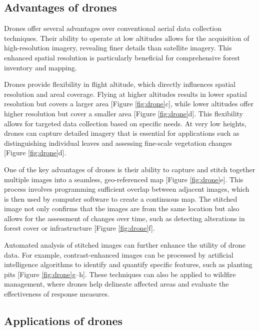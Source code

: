 \documentclass[
  12 pt,
]{Nemilov}
\begin{document}
\subsection{Advantages of drones}\label{advantages-of-drones}

Drones offer several advantages over conventional aerial data collection techniques. Their ability to operate at low altitudes allows for the acquisition of high-resolution imagery, revealing finer details than satellite imagery. This enhanced spatial resolution is particularly beneficial for comprehensive forest inventory and mapping.

Drones provide flexibility in flight altitude, which directly influences spatial resolution and areal coverage. Flying at higher altitudes results in lower spatial resolution but covers a larger area {[}Figure \ref{fig:drone}c{]}, while lower altitudes offer higher resolution but cover a smaller area {[}Figure \ref{fig:drone}d{]}. This flexibility allows for targeted data collection based on specific needs. At very low heights, drones can capture detailed imagery that is essential for applications such as distinguishing individual leaves and assessing fine-scale vegetation changes {[}Figure \ref{fig:drone}d{]}.

One of the key advantages of drones is their ability to capture and stitch together multiple images into a seamless, geo-referenced map {[}Figure \ref{fig:drone}e{]}. This process involves programming sufficient overlap between adjacent images, which is then used by computer software to create a continuous map. The stitched image not only confirms that the images are from the same location but also allows for the assessment of changes over time, such as detecting alterations in forest cover or infrastructure {[}Figure \ref{fig:drone}f{]}.

Automated analysis of stitched images can further enhance the utility of drone data. For example, contrast-enhanced images can be processed by artificial intelligence algorithms to identify and quantify specific features, such as planting pits {[}Figure \ref{fig:drone}g--h{]}. These techniques can also be applied to wildfire management, where drones help delineate affected areas and evaluate the effectiveness of response measures.

\subsection{Applications of drones}\label{applications-of-drones}
\end{document}
